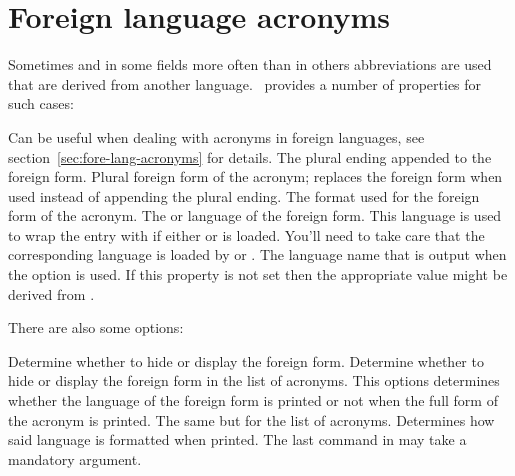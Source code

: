 \documentclass{acro-manual}
\begin{document}
\section{Foreign language acronyms}\label{sec:fore-lang-acronyms}
Sometimes and in some fields more often than in others abbreviations are used
that are derived from another language.  \acro\ provides a number of
properties for such cases:
\begin{properties}
  \Default
    Can be useful when dealing with acronyms in foreign languages, see
    section~\vref{sec:fore-lang-acronyms} for details.
    The plural ending appended to the foreign form.
  \Default
    Plural foreign form of the acronym; replaces the foreign form when used
    instead of appending the plural ending.
  \Default
    The format used for the foreign form of the acronym.
  \Default
    The  or  language of the foreign form. This
    language is used to wrap the entry with
     if either  or
     is loaded.  You'll need to take care that the
    corresponding language is loaded by  or .
  \Default
    The language name that is output when the option
    \code{/} is used.  If this property is not
    set then the appropriate value might be derived from
    .
\end{properties}
There are also some options:
\begin{options}
    Determine whether to hide or display the foreign form.
    Determine whether to hide or display the foreign form in
    the list of acronyms.
    This options determines whether the language of the foreign form is printed
    or not when the full form of the acronym is printed.
    The same but for the list of acronyms.
    Determines how said language is formatted when printed.  The last command
    in  may take a mandatory argument.
\end{options}
\end{document}
